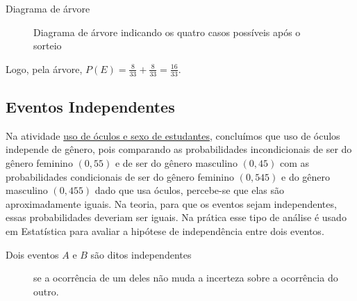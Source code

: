 \begin{example} {Diagrama de árvore}
\begin{figure}[H]
\caption{Diagrama de árvore indicando os quatro casos possíveis após o sorteio}
\label{arvore3}
\end{figure}

Logo, pela árvore, \(\displaystyle P(E)=\frac{8}{33}+\frac{8}{33}=\frac{16}{33}\).
\end{example}


\subsection{Eventos Independentes}

Na atividade \hyperref[uso-oculos]{uso de óculos e sexo de estudantes}, concluímos que uso de óculos independe de gênero, pois  comparando as probabilidades incondicionais de ser do gênero feminino $(0{,}55)$ e de ser do gênero masculino $(0{,}45)$ com as probabilidades condicionais de ser do gênero feminino $(0{,}545)$ e do gênero masculino $(0{,}455)$ dado que usa óculos, percebe-se que elas são aproximadamente iguais. Na teoria, para que os eventos sejam independentes, essas probabilidades deveriam ser iguais. Na prática esse tipo de análise é usado em Estatística para avaliar a hipótese de independência entre dois eventos.
\begin{description}
\item[{Dois eventos \(A\) e \(B\) são ditos independentes}] se a ocorrência de um deles não muda a incerteza sobre a ocorrência do outro.
\end{description}

